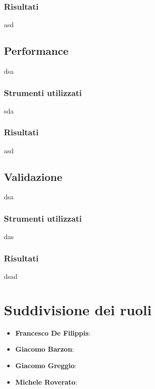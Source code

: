 \documentclass[12pt]{article}
\begin{document}
	\subsubsection{Risultati}
	asd
	
	\subsection{Performance}
	dsa
	\subsubsection{Strumenti utilizzati}
	sda
	\subsubsection{Risultati}
	asd

	\subsection{Validazione}
	dsa
	\subsubsection{Strumenti utilizzati}
	das
	\subsubsection{Risultati}
	dsad
	
	\section{Suddivisione dei ruoli}
	
	\begin{itemize}
		\item \textbf{Francesco De Filippis}: 
		\item \textbf{Giacomo Barzon}:
		\item \textbf{Giacomo Greggio}:
		\item \textbf{Michele Roverato}:
	\end{itemize}
\end{document}

